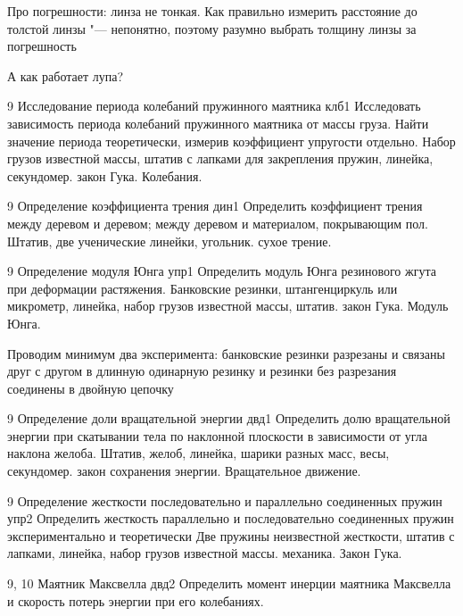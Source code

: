 \begin{enumerate}
{		\item Про погрешности: линза не тонкая. Как правильно измерить расстояние до толстой линзы "--- непонятно, поэтому разумно выбрать толщину линзы за погрешность
		\item А как работает лупа?}
	\item \labtitle
		{9}
		{Исследование периода колебаний пружинного маятника}
		{клб1}
		{Исследовать зависимость периода колебаний пружинного маятника от массы груза. Найти значение периода теоретически, измерив коэффициент упругости отдельно.}
		{Набор грузов известной массы, штатив с лапками для закрепления пружин, линейка, секундомер.}
		{закон Гука. Колебания.}
		{\item}
	\item \labtitle
		{9}
		{Определение коэффициента трения}
		{дин1}
		{Определить коэффициент трения между деревом и деревом; между деревом и материалом, покрывающим пол.}
		{Штатив, две ученические линейки, угольник.}
		{сухое трение.}
		{\item}
	\item \labtitle
		{9}
		{Определение модуля Юнга}
		{упр1}
		{Определить модуль Юнга резинового жгута при деформации растяжения.}
		{Банковские резинки, штангенциркуль или микрометр, линейка, набор грузов известной массы, штатив.}
		{закон Гука. Модуль Юнга.}
		{\item Проводим минимум два эксперимента: банковские резинки разрезаны и связаны друг с другом в длинную одинарную резинку и резинки без разрезания соединены в двойную цепочку}
	\item \labtitle
		{9}
		{Определение доли вращательной энергии}
		{двд1}
		{Определить долю вращательной энергии при скатывании тела по наклонной плоскости в зависимости от угла наклона желоба.}
		{Штатив, желоб, линейка, шарики разных масс, весы, секундомер.}
		{закон сохранения энергии. Вращательное движение.}
		{\item}
	\item \labtitle
		{9}
		{Определение жесткости последовательно и параллельно соединенных пружин}
		{упр2}
		{Определить жесткость параллельно и последовательно соединенных пружин экспериментально и теоретически}
		{Две пружины неизвестной жесткости, штатив с лапками, линейка, набор грузов известной массы.}
		{механика. Закон Гука.}
		{\item}
	\item \labtitle
		{9, 10}
		{Маятник Максвелла}
		{двд2}
		{Определить момент инерции маятника Максвелла и скорость потерь энергии при его колебаниях.}

\end{enumerate}
